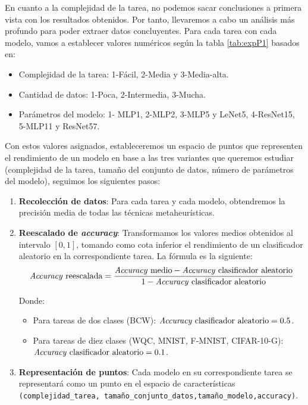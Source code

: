 En cuanto a la complejidad de la tarea, no podemos sacar conclusiones a primera vista con los resultados obtenidos. Por tanto, llevaremos a cabo un análisis más profundo para poder extraer datos concluyentes. Para cada tarea con cada modelo, vamos a establecer valores numéricos según la tabla \ref{tab:expP1} basados en:

\begin{itemize}
	\item Complejidad de la tarea: 1-Fácil, 2-Media y 3-Media-alta.
	\item Cantidad de datos: 1-Poca, 2-Intermedia, 3-Mucha.
	\item Parámetros del modelo: 1- MLP1, 2-MLP2, 3-MLP5 y LeNet5, 4-ResNet15, 5-MLP11 y ResNet57.
\end{itemize}

Con estos valores asignados, estableceremos un espacio de puntos que representen el rendimiento de un modelo en base a las tres variantes que queremos estudiar (complejidad de la tarea, tamaño del conjunto de datos, número de parámetros del modelo), seguimos los siguientes pasos:

\begin{enumerate}
	\item \textbf{Recolección de datos}: Para cada tarea y cada modelo, obtendremos la precisión media de todas las técnicas metaheurísticas.
	
	\item{ \textbf{Reescalado de \textit{accuracy}}: Transformamos los valores medios obtenidos al intervalo $[0,1]$, tomando como cota inferior el rendimiento de un clasificador aleatorio en la correspondiente tarea. La fórmula es la siguiente:
	 \[
	\text{\textit{Accuracy} reescalada} = \frac{\text{\textit{Accuracy} medio} - \text{\textit{Accuracy} clasificador aleatorio}}{1 - \text{\textit{Accuracy} clasificador aleatorio}}
	\]
	
	Donde:
	\begin{itemize}
	    \item Para tareas de dos clases (BCW): $\text{\textit{Accuracy} clasificador aleatorio} = 0.5$.
	    \item Para tareas de diez clases (WQC, MNIST, F-MNIST, CIFAR-10-G): $\text{\textit{Accuracy} clasificador aleatorio} = 0.1$.
	\end{itemize}
	
	}
	\item \textbf{Representación de puntos}: Cada modelo en su correspondiente tarea se representará como un punto en el espacio de características \verb|(complejidad_tarea, tamaño_conjunto_datos,tamaño_modelo,accuracy)|.
\end{enumerate}

